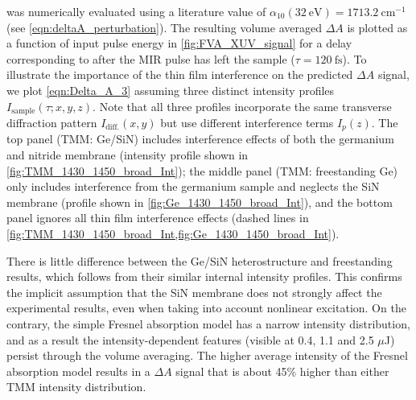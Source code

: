  was numerically evaluated using a literature value of ${\alpha_{10}(32 \ \textrm{eV}) = 1713.2 \ \textrm{cm}^{-1}}$ (see \cref{eqn:deltaA_perturbation}). The resulting volume averaged $\Delta A$ is plotted as a function of input pulse energy in \cref{fig:FVA_XUV_signal} for a delay corresponding to after the MIR pulse has left the sample ($\tau = 120 \ \textrm{fs}$). To illustrate the importance of the thin film interference on the predicted $\Delta A$ signal, we plot \cref{eqn:Delta_A_3} assuming three distinct intensity profiles $I_{\textrm{sample}}(\tau; x, y, z)$. Note that all three profiles incorporate the same transverse diffraction pattern $I_{\textrm{diff.}}(x, y)$ but use different interference terms $I_p(z)$. The top panel (TMM: Ge/SiN) includes interference effects of both the germanium and nitride membrane (intensity profile shown in \cref{fig:TMM_1430_1450_broad_Int}); the middle panel (TMM: freestanding Ge) only includes interference from the germanium sample and neglects the SiN membrane (profile shown in \cref{fig:Ge_1430_1450_broad_Int}), and the bottom panel ignores all thin film interference effects (dashed lines in \cref{fig:TMM_1430_1450_broad_Int,fig:Ge_1430_1450_broad_Int}).

There is little difference between the Ge/SiN heterostructure and freestanding results, which follows from their similar internal intensity profiles. This confirms the implicit assumption that the SiN membrane does not strongly affect the experimental results, even when taking into account nonlinear excitation. On the contrary, the simple Fresnel absorption model has a narrow intensity distribution, and as a result the intensity-dependent features (visible at 0.4, 1.1 and 2.5 $\mu$J) persist through the volume averaging. The higher average intensity of the Fresnel absorption model results in a $\Delta A$ signal that is about 45\% higher than either TMM intensity distribution.


